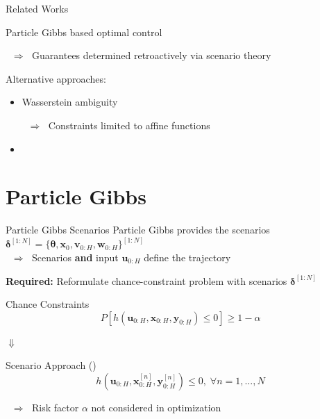 \documentclass[student, noshadow, itr, english, aspectratio=169]{ITR_LSR_slides}
\begin{document}
\begin{frame}{Related Works}

Particle Gibbs based optimal control \textbf{\cite{Robert_24}}

$\;\; \Rightarrow \;$ Guarantees determined retroactively via scenario theory

\vspace{.4cm}

Alternative approaches:
\begin{itemize}
\item Wasserstein ambiguity \cite{Hota_19}

$\;\; \Rightarrow \;$ Constraints limited to affine functions
\item {} \textbf{\cite{Yassine_22}}\\
\makebox[3cm]{\hfill}   \cite{Adam_22} 
\end{itemize}
\end{frame}


\section{Particle Gibbs}

\begin{frame}{Particle Gibbs Scenarios}
Particle Gibbs provides the scenarios $\boldsymbol{\delta}^{[1:N]} = \{ \boldsymbol{\theta}, \boldsymbol{x}_0, \boldsymbol{v}_{0:H}, \boldsymbol{w}_{0:H}\}^{[1:N]}$\\

$\;\; \Rightarrow \;$ Scenarios \textbf{and} input $\boldsymbol{u}_{0:H}$ define the trajectory

\textbf{Required:} Reformulate chance-constraint problem with scenarios $\boldsymbol{\delta}^{[1:N]}$

\begin{block}{Chance Constraints}
	\begin{equation*}
		P \left[ h(\boldsymbol{u}_{0:H},  \boldsymbol{x}_{0:H},  \boldsymbol{y}_{0:H}) \leq 0 \right] \geq 1 - \alpha
	\end{equation*}
\end{block}	

\makebox[6.7cm]{\hfill} $\boldsymbol{\Downarrow}$ 

\begin{block}{Scenario Approach (\cite{Robert_24})}
	\begin{equation*}
		 h(\boldsymbol{u}_{0:H},  \boldsymbol{x}_{0:H}^{[n]},  \boldsymbol{y}_{0:H}^{[n]}) \leq 0, \; \forall n = 1, ..., N
	\end{equation*}
\end{block}

$\;\; \Rightarrow \;$ Risk factor $\alpha$ not considered in optimization



\end{frame}
\end{document}
